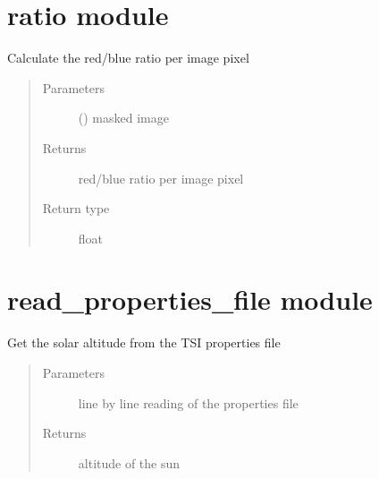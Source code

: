 \documentclass[letterpaper,10pt,english]{sphinxmanual}
\begin{document}
\section{ratio module}
\label{\detokenize{ratio:ratio-module}}\label{\detokenize{ratio::doc}}\label{\detokenize{ratio:module-ratio}}

\begin{fulllineitems}
\label{\detokenize{ratio:ratio.red_blue}}
Calculate the red/blue ratio per image pixel
\begin{quote}\begin{description}
\item[{Parameters}] \leavevmode
{} () \textendash{} masked image

\item[{Returns}] \leavevmode
red/blue ratio per image pixel

\item[{Return type}] \leavevmode
float

\end{description}\end{quote}

\end{fulllineitems}



\section{read\_properties\_file module}
\label{\detokenize{read_properties_file:read-properties-file-module}}\label{\detokenize{read_properties_file:module-read_properties_file}}\label{\detokenize{read_properties_file::doc}}

\begin{fulllineitems}
\label{\detokenize{read_properties_file:read_properties_file.get_altitude}}
Get the solar altitude from the TSI properties file
\begin{quote}\begin{description}
\item[{Parameters}] \leavevmode
{} \textendash{} line by line reading of the properties file

\item[{Returns}] \leavevmode
altitude of the sun

\end{description}\end{quote}

\end{fulllineitems}
\end{document}
